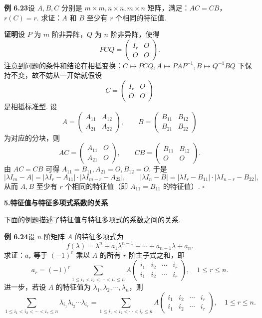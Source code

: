 \documentclass[UTF8, 12pt, fontset=fandol, oneside]{ctexart}
\begin{document}
\noindent\textbf{例 6.23}\quad 设 $A,B,C$ 分别是 $m\times m,n\times n,m\times n$ 矩阵，满足：$AC=CB$，$r(C)=r$. 求证：$A$ 和 $B$ 至少有 $r$ 个相同的特征值.

\noindent\textbf{证明}\quad 设 $P$ 为 $m$ 阶非异阵，$Q$ 为 $n$ 阶非异阵，使得
\[
PCQ=\left(\begin{array}{cc}
I_r & O\\
O & O
\end{array}\right).
\]
注意到问题的条件和结论在相抵变换：$C\mapsto PCQ,A\mapsto PAP^{-1},B\mapsto Q^{-1}BQ$ 下保持不变，故不妨从一开始就假设
\[
C=\left(\begin{array}{cc}
I_r & O\\
O & O
\end{array}\right)
\]
是相抵标准型. 设
\[
A=\left(\begin{array}{cc}
A_{11} & A_{12}\\
A_{21} & A_{22}
\end{array}\right),\qquad
B=\left(\begin{array}{cc}
B_{11} & B_{12}\\
B_{21} & B_{22}
\end{array}\right)
\]
为对应的分块，则
\[
AC=\left(\begin{array}{cc}
A_{11} & O\\
A_{21} & O
\end{array}\right),\qquad
CB=\left(\begin{array}{cc}
B_{11} & B_{12}\\
O & O
\end{array}\right).
\]
由 $AC=CB$ 可得 $A_{11}=B_{11},A_{21}=O,B_{12}=O$. 于是
\[
|\lambda I_m-A|=|\lambda I_r-A_{11}|\cdot|\lambda I_{m-r}-A_{22}|,\qquad
|\lambda I_n-B|=|\lambda I_r-B_{11}|\cdot|\lambda I_{n-r}-B_{22}|,
\]
从而 $A,B$ 至少有 $r$ 个相同的特征值（即 $A_{11}=B_{11}$ 的特征值）. $\square$

\noindent\textbf{5.\quad 特征值与特征多项式系数的关系}

下面的例题描述了特征值与特征多项式的系数之间的关系.

\noindent\textbf{例 6.24}\quad 设 $n$ 阶矩阵 $A$ 的特征多项式为
\[
f(\lambda)=\lambda^n+a_1\lambda^{n-1}+\cdots+a_{n-1}\lambda+a_n.
\]
求证：$a_r$ 等于 $(-1)^r$ 乘以 $A$ 的所有 $r$ 阶主子式之和，即
\[
a_r=(-1)^r\sum_{1\le i_1<i_2<\cdots<i_r\le n}
A\left(\begin{array}{cccc}
i_1 & i_2 & \cdots & i_r\\
i_1 & i_2 & \cdots & i_r
\end{array}\right),\quad 1\le r\le n.
\]
进一步，若设 $A$ 的特征值为 $\lambda_1,\lambda_2,\cdots,\lambda_n$，则
\[
\sum_{1\le i_1<i_2<\cdots<i_r\le n}
\lambda_{i_1}\lambda_{i_2}\cdots\lambda_{i_r}
=\sum_{1\le i_1<i_2<\cdots<i_r\le n}
A\left(\begin{array}{cccc}
i_1 & i_2 & \cdots & i_r\\
i_1 & i_2 & \cdots & i_r
\end{array}\right),\quad 1\le r\le n.
\]
\end{document}
